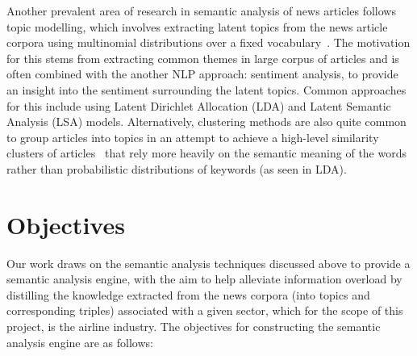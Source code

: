 Another prevalent area of research in semantic analysis of news articles follows topic modelling, which involves extracting latent topics from the news article corpora using multinomial distributions over a fixed vocabulary~\cite{nouns_only_lda}. The motivation for this stems from extracting common themes in large corpus of articles and is often combined with the another NLP approach: sentiment analysis, to provide an insight into the sentiment surrounding the latent topics. Common approaches for this include using Latent Dirichlet Allocation (LDA) and Latent Semantic Analysis (LSA) models. Alternatively, clustering methods are also quite common to group articles into topics in an attempt to achieve a high-level similarity clusters of articles~\cite{clustering_intro} that rely more heavily on the semantic meaning of the words rather than probabilistic distributions of keywords (as seen in LDA). 

\section{Objectives} \label{objectives}

Our work draws on the semantic analysis techniques discussed above to provide a semantic analysis engine, with the aim to help alleviate information overload by distilling the knowledge extracted from the news corpora (into topics and corresponding triples) associated with a given sector, which for the scope of this project, is the airline industry. The objectives for constructing the semantic analysis engine are as follows: 




